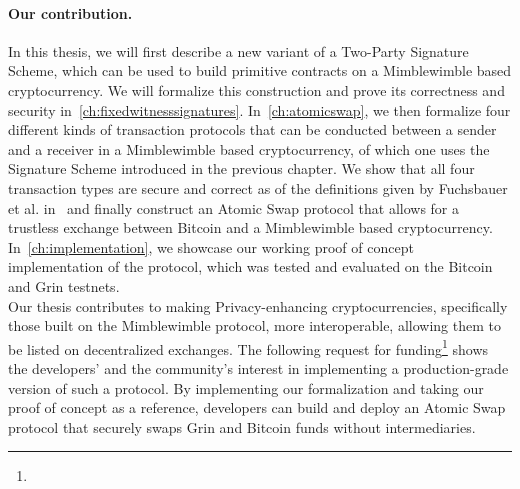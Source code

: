 \paragraph{Our contribution.} In this thesis, we will first describe a new variant of a Two-Party Signature Scheme, which can be used to build primitive contracts on a Mimblewimble based cryptocurrency.
We will formalize this construction and prove its correctness and security in~\cref{ch:fixedwitnesssignatures}.
In~\cref{ch:atomicswap}, we then formalize four different kinds of transaction protocols that can be conducted between a sender and a receiver in a Mimblewimble based cryptocurrency, of which one uses the Signature Scheme introduced in the previous chapter.
We show that all four transaction types are secure and correct as of the definitions given by Fuchsbauer et al. in~\cite{fuchsbauer2019aggregate} and finally construct an Atomic Swap protocol that allows for a trustless exchange between Bitcoin and a Mimblewimble based cryptocurrency.
In~\cref{ch:implementation}, we showcase our working proof of concept implementation of the protocol, which was tested and evaluated on the Bitcoin and Grin testnets.\\
Our thesis contributes to making Privacy-enhancing cryptocurrencies, specifically those built on the Mimblewimble protocol, more interoperable, allowing them to be listed on decentralized exchanges.
The following request for funding\footnote{\urlgrinfund} shows the developers' and the community's interest in implementing a production-grade version of such a protocol.
By implementing our formalization and taking our proof of concept as a reference, developers can build and deploy an Atomic Swap protocol that securely swaps Grin and Bitcoin funds without intermediaries.